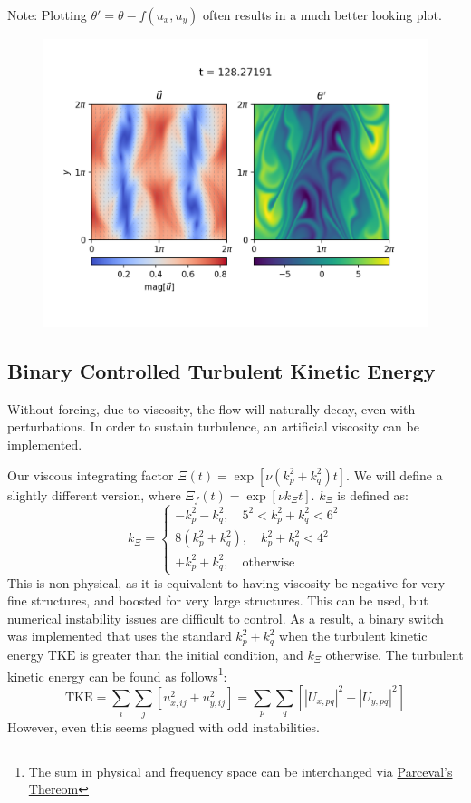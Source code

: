 \documentclass[12pt, reqno]{amsart}
\begin{document}
Note: Plotting $\theta' = \theta - f(u_x, u_y)$ often results in a much better looking plot.

\begin{figure}[H]
    \centering
    \includegraphics[width = 1\linewidth]{scalar_transport.png}
\end{figure}

\subsection{Binary Controlled Turbulent Kinetic Energy}
Without forcing, due to viscosity, the flow will naturally decay, even with perturbations. In order to sustain turbulence, an artificial viscosity can be implemented. 

Our viscous integrating factor $\Xi(t) = \exp [\nu(k_p^2 + k_q^2) t]$. We will define a slightly different version, where $\Xi_f(t) = \exp [\nu k_\Xi t]$. $k_\Xi$ is defined as:
\begin{equation}
    k_\Xi = \begin{cases}
        -k_p^2 - k_q^2, \quad 5^2 < k_p^2 + k_q^2 < 6^2 \\
        8(k_p^2 + k_q^2), \quad k_p^2 + k_q^2 < 4^2 \\
        +k_p^2 + k_q^2, \quad \mathrm{otherwise}
    \end{cases}
\end{equation}
This is non-physical, as it is equivalent to having viscosity be negative for very fine structures, and boosted for very large structures. This can be used, but numerical instability issues are difficult to control. As a result, a binary switch was implemented that uses the standard $k_p^2 + k_q^2$ when the turbulent kinetic energy $\mathrm{TKE}$ is greater than the initial condition, and $k_\Xi$ otherwise. The turbulent kinetic energy can be found as follows\footnote{The sum in physical and frequency space can be interchanged via \href{https://en.wikipedia.org/wiki/Parseval\%27s\_theorem}{Parceval's Thereom}}:
\begin{equation}
    \mathrm{TKE} = \sum_i \sum_j \left[ u_{x, ij}^2 + u_{y, ij}^2 \right] = \sum_p \sum_q \left[ |U_{x, pq}|^2 + |U_{y, pq}|^2 \right]
\end{equation}
However, even this seems plagued with odd instabilities. 
\end{document}

